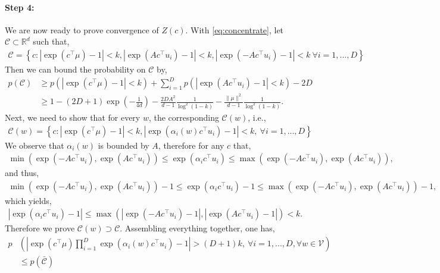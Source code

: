 \documentclass{article} \usepackage{acl2017,times}
\newenvironment{proof}[1][Proof]{\begin{trivlist}
\item[\hskip \labelsep {\bfseries #1}]}{\end{trivlist}}
\begin{document}
\begin{proof}
\paragraph{Step 4:} We are now ready to prove convergence of $Z(c)$. With \eqref{eq:concentrate}, let $\mathcal{C}\subset\mathbb{R}^d$ such that,
\begin{align*}
    \mathcal{C} = \left\{c:\left|\exp(c^{\top} \mu) - 1 \right| < k, \left| \exp(A c^{\top} u_i) - 1\right| < k , \left| \exp(-A c^{\top} u_i) - 1\right| < k\ \forall i=1,...,D \right\}
\end{align*}
Then we can bound the probability on $\mathcal{C}$ by,
\begin{align*}
  p(\mathcal{C}) 
    &\ge p\left(\left|\exp(c^{\top} \mu) - 1 \right| < k\right)  + \sum_{i=1}^D p(\left| \exp(A c^{\top} u_i) - 1\right| < k) - 2D \\
    &\ge 1 - (2D+1) \exp\left(-\frac{1}{4d}\right) - \frac{2DA^2}{d-1}\frac{1}{\log^2(1-k)} - \frac{\|\mu\|^2}{d-1}\frac{1}{\log^2(1-k)}.
\end{align*}
Next, we need to show that for every $w$, the corresponding $\mathcal{C}(w)$, i.e.,
\begin{align*}
    \mathcal{C}(w) = \left\{c:\left|\exp(c^{\top} \mu) - 1 \right| < k, \left| \exp(\alpha_i(w) c^{\top} u_i) - 1\right| < k , \ \forall i=1,...,D \right\}
\end{align*}
We observe that $\alpha_i(w)$ is bounded by $A$, therefore for any $c$ that,
\begin{align*}
    \min(\exp(-Ac^{\top}u_i), \exp(A c^{\top}u_i)) \le \exp(\alpha_i c^{\top}u_i) \le \max(\exp(-Ac^{\top}u_i), \exp(A c^{\top}u_i)),
\end{align*}
and thus,
\begin{align*}
    \min(\exp(-Ac^{\top}u_i), \exp(A c^{\top}u_i)) - 1\le \exp(\alpha_i c^{\top}u_i) - 1 \le \max(\exp(-Ac^{\top}u_i), \exp(A c^{\top}u_i)) - 1,
\end{align*}
which yields,
\begin{align*}
  |\exp(\alpha_i c^{\top}u_i) - 1| \le \max(|\exp(-Ac^{\top}u_i)-1|, |\exp(A c^{\top}u_i)- 1|) < k.
\end{align*}
Therefore we prove $\mathcal{C}(w) \supset \mathcal{C}$. Assembling everything together, one has,
\begin{align*}
p&\left(\left|\exp(c^{\top} \mu)\prod_{i=1}^D \exp(\alpha_i(w) c^{\top} u_i) - 1\right| > (D+1)k , \ \forall i=1,...,D, \forall w \in \mathcal{V}\right) \\
& \le p(\bar{\mathcal{C}}) \\

\end{align*}
\end{proof}
\end{document}
